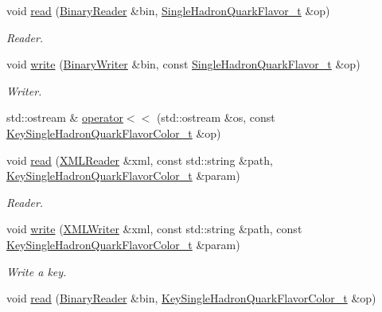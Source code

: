\begin{DoxyCompactItemize}
void \mbox{\hyperlink{namespaceHadron_ae80a1bcfb7767fb7993d4a439d6493ba}{read}} (\mbox{\hyperlink{classADATIO_1_1BinaryReader}{Binary\+Reader}} \&bin, \mbox{\hyperlink{structHadron_1_1SingleHadronQuarkFlavor__t}{Single\+Hadron\+Quark\+Flavor\+\_\+t}} \&op)
\begin{DoxyCompactList}\small\item\em Reader. \end{DoxyCompactList}\item 
void \mbox{\hyperlink{namespaceHadron_a2994f8fc2ad609574b948b8671232dd8}{write}} (\mbox{\hyperlink{classADATIO_1_1BinaryWriter}{Binary\+Writer}} \&bin, const \mbox{\hyperlink{structHadron_1_1SingleHadronQuarkFlavor__t}{Single\+Hadron\+Quark\+Flavor\+\_\+t}} \&op)
\begin{DoxyCompactList}\small\item\em Writer. \end{DoxyCompactList}\item 
std\+::ostream \& \mbox{\hyperlink{namespaceHadron_ac39a55fe17a7ba63e515041398ff55e4}{operator$<$$<$}} (std\+::ostream \&os, const \mbox{\hyperlink{structHadron_1_1KeySingleHadronQuarkFlavorColor__t}{Key\+Single\+Hadron\+Quark\+Flavor\+Color\+\_\+t}} \&op)
\item 
void \mbox{\hyperlink{namespaceHadron_a3b1ec7d213815eedf06fcd0e518eb5d3}{read}} (\mbox{\hyperlink{classADATXML_1_1XMLReader}{X\+M\+L\+Reader}} \&xml, const std\+::string \&path, \mbox{\hyperlink{structHadron_1_1KeySingleHadronQuarkFlavorColor__t}{Key\+Single\+Hadron\+Quark\+Flavor\+Color\+\_\+t}} \&param)
\begin{DoxyCompactList}\small\item\em Reader. \end{DoxyCompactList}\item 
void \mbox{\hyperlink{namespaceHadron_a64d17f6dc5e4987b14cc4a2d33401b7c}{write}} (\mbox{\hyperlink{classADATXML_1_1XMLWriter}{X\+M\+L\+Writer}} \&xml, const std\+::string \&path, const \mbox{\hyperlink{structHadron_1_1KeySingleHadronQuarkFlavorColor__t}{Key\+Single\+Hadron\+Quark\+Flavor\+Color\+\_\+t}} \&param)
\begin{DoxyCompactList}\small\item\em Write a key. \end{DoxyCompactList}\item 
void \mbox{\hyperlink{namespaceHadron_afc23e5e61669cc277e94a613ee812b0f}{read}} (\mbox{\hyperlink{classADATIO_1_1BinaryReader}{Binary\+Reader}} \&bin, \mbox{\hyperlink{structHadron_1_1KeySingleHadronQuarkFlavorColor__t}{Key\+Single\+Hadron\+Quark\+Flavor\+Color\+\_\+t}} \&op)

\end{DoxyCompactItemize}
